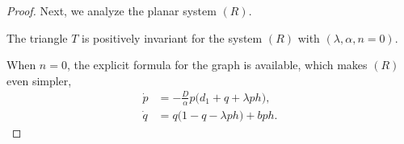 \documentclass[a4paper,11pt]{article}
\begin{document}
\begin{proof}
Next, we analyze the planar system $(R)$. %

% 
% 
\medskip
{}
The triangle $T$  is positively invariant for the system $(R)$ with $(\lambda,\alpha,n=0)$.
\medskip

When $n=0$, the explicit formula for the graph is available, which makes $(R)$ even simpler,
\begin{align*}
 \dot{p} &= -\frac{D}{\alpha} p\Big(d_1+q+\lambda p h\Big),\\
 \dot{q} &= q\Big(1-q-\lambda p h\Big) + b p h.
\end{align*}




\end{proof}
\end{document}
